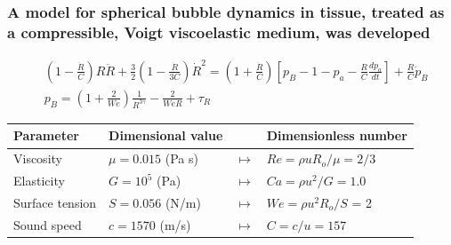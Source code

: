 % 

% 
% 

% 
% 
\begin{frame}%
  \frametitle{A model for spherical bubble dynamics in tissue, treated as a compressible, Voigt viscoelastic medium, was developed}%
  {\footnotesize
    \begin{align*}
      &\left(1-\frac{\dot{R}}{C}\right) R \ddot{R} + \frac{3}{2}\left(1-\frac{\dot{R}}{3 C}\right) \dot{R}^2 = \left(1+\frac{\dot{R}}{C}\right) \left[p_B- 1 -p_a - \frac{R}{C}\frac{dp_a}{dt}\right] +\frac{R}{C} \dot{p}_B\\
      &p_B = \left(1+\frac{2}{We}\right)\frac{1}{R^{3\gamma}}-\frac{2}{WeR} + \tau_R
    \end{align*}
  }

  \vspace*{1cm}
  \begin{tabular}{l l c l}
    Parameter & Dimensional value & & Dimensionless number \\ \hline
    Viscosity & $\mu=0.015$ (Pa s) & $\mapsto$ & $Re=\rho u R_o / \mu = 2/3$ \\
    Elasticity & $G=10^5$ (Pa) & $\mapsto$ & $Ca= \rho u^2 / G = 1.0$ 	\\
    Surface tension & $S=0.056$ (N/m) & $\mapsto$ & $We=\rho u^2 R_o / S$ = 2 \\
    Sound speed & $c=1570$ (m/s) & $\mapsto$ & $C = c/u=157$ \\  
  \end{tabular}
  \vfill
\end{frame}%
% 
% 
